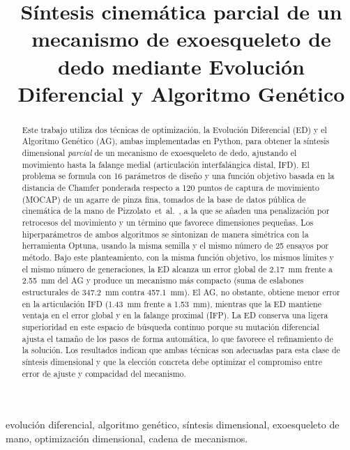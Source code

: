 \documentclass[conference]{IEEEtran}
\begin{document}
\title{Síntesis cinemática parcial de un mecanismo de exoesqueleto de dedo mediante Evolución Diferencial y Algoritmo Genético}

\author{}

\maketitle
\thispagestyle{fancy}

\begin{abstract}
Este trabajo utiliza dos técnicas de optimización, la Evolución Diferencial (ED) y
el Algoritmo Genético (AG), ambas implementadas en Python, para obtener la
síntesis dimensional \emph{parcial} de un mecanismo de exoesqueleto de dedo, ajustando el movimiento hasta la falange
medial (articulación interfalángica distal, IFD). El problema se formula con 16
parámetros de diseño y una función objetivo basada en la distancia de Chamfer
ponderada respecto a 120 puntos de captura de movimiento (MOCAP) de un agarre de
pinza fina, tomados de la base de datos pública de cinemática de la mano de
Pizzolato~et~al.\ \cite{ref_pizzolato}, a la que se añaden una penalización por
retrocesos del movimiento y un término que favorece dimensiones pequeñas. Los
hiperparámetros de ambos algoritmos se sintonizan de manera simétrica con la
herramienta Optuna, usando la misma semilla y el mismo número de 25 ensayos por
método. Bajo este planteamiento, con la misma función objetivo, los mismos límites
y el mismo número de generaciones, la ED alcanza un error global de 2.17~mm frente
a 2.55~mm del AG y produce un mecanismo más compacto (suma de eslabones
estructurales de 347.2~mm contra 457.1~mm). El AG, no obstante, obtiene menor
error en la articulación IFD (1.43~mm frente a 1.53~mm), mientras que la ED
mantiene ventaja en el error global y en la falange proximal (IFP). La ED conserva
una ligera superioridad en este espacio de búsqueda continuo porque su mutación
diferencial ajusta el tamaño de los pasos de forma automática, lo que favorece el
refinamiento de la solución. Los resultados indican que ambas técnicas son
adecuadas para esta clase de síntesis dimensional y que la elección concreta debe
optimizar el compromiso entre error de ajuste y compacidad del mecanismo.
\end{abstract}

\begin{IEEEkeywords}
evolución diferencial, algoritmo genético, síntesis dimensional, exoesqueleto de
mano, optimización dimensional, cadena de mecanismos.
\end{IEEEkeywords}
\end{document}
